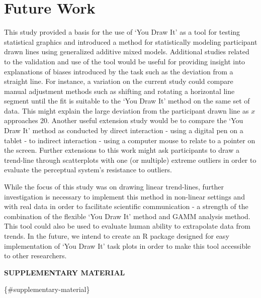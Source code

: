 \documentclass[12pt]{article}
\begin{document}
\hypertarget{future-work}{%
\section{Future Work}\label{future-work}}

This study provided a basis for the use of `You Draw It' as a tool for
testing statistical graphics and introduced a method for statistically
modeling participant drawn lines using generalized additive mixed
models. Additional studies related to the validation and use of the tool
would be useful for providing insight into explanations of biases
introduced by the task such as the deviation from a straight line. For
instance, a variation on the current study could compare manual
adjustment methods such as shifting and rotating a horizontal line
segment until the fit is suitable to the `You Draw It' method on the
same set of data. This might explain the large deviation from the
participant drawn line as \(x\) approaches 20. Another useful extension
study would be to compare the `You Draw It' method as conducted by
direct interaction - using a digital pen on a tablet - to indirect
interaction - using a computer mouse to relate to a pointer on the
screen. Further extensions to this work might ask participants to draw a
trend-line through scatterplots with one (or multiple) extreme outliers
in order to evaluate the perceptual system's resistance to outliers.

While the focus of this study was on drawing linear trend-lines, further
investigation is necessary to implement this method in non-linear
settings and with real data in order to facilitate scientific
communication - a strength of the combination of the flexible `You Draw
It' method and GAMM analysis method. This tool could also be used to
evaluate human ability to extrapolate data from trends. In the future,
we intend to create an R package designed for easy implementation of
`You Draw It' task plots in order to make this tool accessible to other
researchers.

\begin{center}
{\large\bf SUPPLEMENTARY MATERIAL}
\end{center}

\{\#supplementary-material\}
\end{document}
